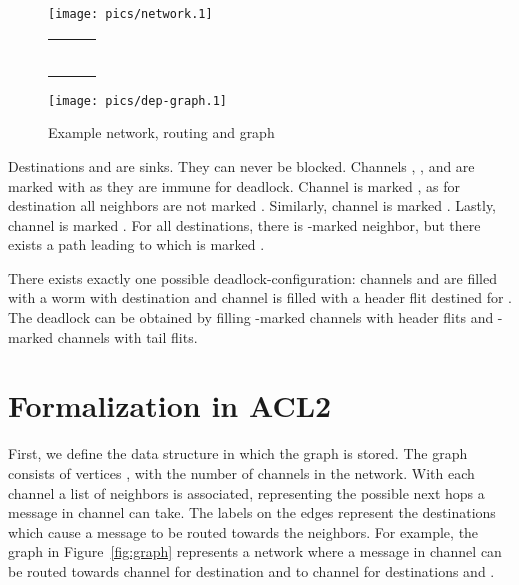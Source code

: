\documentclass[submission,copyright]{eptcs}
\begin{document}
\begin{figure}[htbp]
\centering
\begin{minipage}[b]{0.32\linewidth}\centering
        \texttt{[image: pics/network.1]}
\end{minipage}
\begin{minipage}[b]{0.32\linewidth}\centering
        \begin{tabular}{l|l|l}
         &  & \\\hline\hline
         &  & \\
         &  & \\
         &  & \\
         &  & \\
         &  & \\
         &  & \\\hline
        \end{tabular}

        \vspace{0em}
\end{minipage}
\begin{minipage}[b]{0.32\linewidth}\centering
        \texttt{[image: pics/dep-graph.1]}
\end{minipage}
\caption{Example network, routing and graph}
\label{fig:ex-trace}
\end{figure}


Destinations  and  are sinks. They can never be blocked. Channels , , and  are marked with  as they are immune for deadlock.
Channel  is marked , as for destination  all neighbors are not marked .
Similarly, channel  is marked .
Lastly, channel  is marked . For all destinations, there is -marked neighbor, but there exists a path leading to  which is marked .

There exists exactly one possible deadlock-configuration: channels  and  are filled with a worm with destination  and channel  is filled with a header flit destined for .
The deadlock can be obtained by filling -marked channels with header flits and -marked channels with tail flits. 




\section{Formalization in ACL2}\label{sec:formalizing}

First, we define the data structure in which the graph is stored. The graph consists of vertices , with  the number of channels in the network. With each channel  a list of neighbors is associated, representing the possible next hops a message in channel  can take. The labels on the edges represent the destinations which cause a message to be routed towards the neighbors. For example, the graph in Figure~\ref{fig:graph} represents a network where a message in channel  can be routed towards channel  for destination  and to channel  for destinations  and . 
\end{document}
